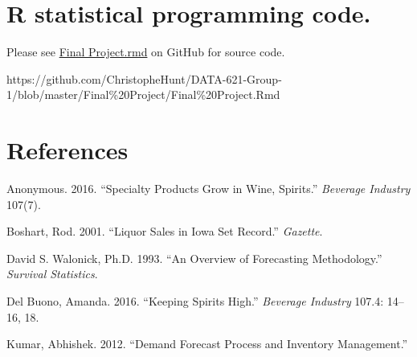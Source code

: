 \documentclass[]{elsarticle} %
\begin{document}
\section{R statistical programming
code.}\label{r-statistical-programming-code.}

Please see
\href{https://github.com/ChristopheHunt/DATA-621-Group-1/blob/master/Final\%20Project/Final\%20Project.Rmd}{Final
Project.rmd} on GitHub for source code.

https://github.com/ChristopheHunt/DATA-621-Group-1/blob/master/Final\%20Project/Final\%20Project.Rmd

\newpage

\section*{References}\label{references}

\hypertarget{refs}{}
\hypertarget{ref-SpecialityGrow3}{}
Anonymous. 2016. ``Specialty Products Grow in Wine, Spirits.''
\emph{Beverage Industry} 107(7).

\hypertarget{ref-IowaSetsRecord2}{}
Boshart, Rod. 2001. ``Liquor Sales in Iowa Set Record.'' \emph{Gazette}.

\hypertarget{ref-Forecast1}{}
David S. Walonick, Ph.D. 1993. ``An Overview of Forecasting
Methodology.'' \emph{Survival Statistics}.

\hypertarget{ref-KeepingSpiritsHigh1}{}
Del Buono, Amanda. 2016. ``Keeping Spirits High.'' \emph{Beverage
Industry} 107.4: 14--16, 18.

\hypertarget{ref-Demand1}{}
Kumar, Abhishek. 2012. ``Demand Forecast Process and Inventory
Management.''
\end{document}

